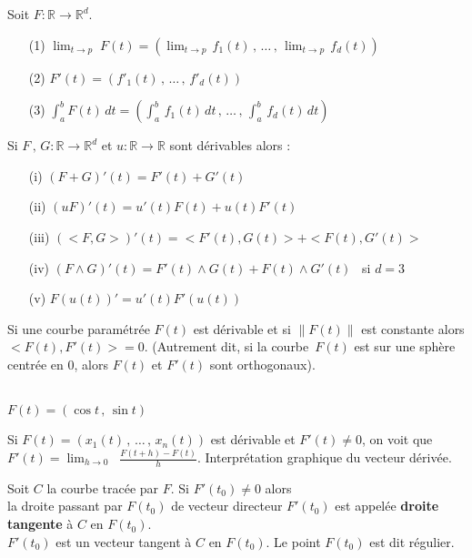 \documentclass[class=report,crop=false]{standalone}
\begin{document}
\begin{definition}
Soit $F : \mathbb{R} \rightarrow \mathbb{R}^d$.
\begin{enumerate}
\item[(1)] $\displaystyle \lim_{t \rightarrow p} \;F(t) = \left( \lim_{t \rightarrow p} \,f_{1}(t) \,,\, \dots \,,\, \lim_{t \rightarrow p} \,f_{d}(t) \right)$
\item[(2)] $F'(t) = (f'_{1}(t) \,,\, \dots \,,\, f'_{d}(t))$
\item[(3)] $\displaystyle \int_{a}^b F(t)\, dt = \left(  \int_{a}^b\, f_{1}(t)\, dt \,,\, \dots \,,\, \int_{a}^b\, f_{d}(t)\, dt \right)$
\end{enumerate}
\end{definition}

\begin{theoreme}
Si $F\,,\, G :  \mathbb{R} \rightarrow \mathbb{R}^d$ et $u : \mathbb{R} \rightarrow \mathbb{R}$ sont dérivables alors :
\begin{enumerate}
\item[(i)] $(F + G)' (t) = F'(t) + G'(t)$
\item[(ii)] $(uF)' (t) = u'(t) F(t) + u(t) F'(t)$
\item[(iii)] $(<F , G>)' (t) = <F'(t), G(t)> + <F(t), G'(t)>$\item[(iv)] $(F \land G)' (t) = F'(t) \land G(t) + F(t) \land G'(t)$ \ si $d = 3$
\item[(v)] $F(u(t))' = u'(t) F'(u(t)) $
\end{enumerate}
\end{theoreme}



\begin{corollaire}
Si une courbe paramétrée $F(t)$ est dérivable et si $\|F(t)\|$ est constante alors $<F(t) , F'(t)> = 0$. 
(Autrement dit, si la courbe~$F(t)$ est sur une sph\`ere centrée en 0, alors $F(t)$ et $F'(t)$ sont orthogonaux).
\end{corollaire}


\\
$F(t) = (\cos t \,,\, \sin t)$ 






Si $F(t) = (x_{1}(t) \,,\, \dots \,,\,  x_{n}(t))$ est dérivable et $F'(t) \neq 0$, on voit que $F'(t) = \displaystyle \lim_{h\to 0}\;\; \frac{F(t + h) - F(t)}{h}$\;. Interprétation graphique du vecteur dérivée.


\begin{definition}
Soit $C$ la courbe tracée par $F$. %
Si $F'(t_{0}) \neq 0$ alors\\ la droite passant par $F(t_{0})$ de vecteur directeur $F'(t_{0})$ est appelée {\bf droite tangente} \`a $C$ en $F(t_{0})$.\\
 $F'(t_{0})$ est un vecteur tangent \`a $C$ en $F(t_{0})$.                      Le point $F(t_0)$ est dit régulier.
\end{definition}
\end{document}
